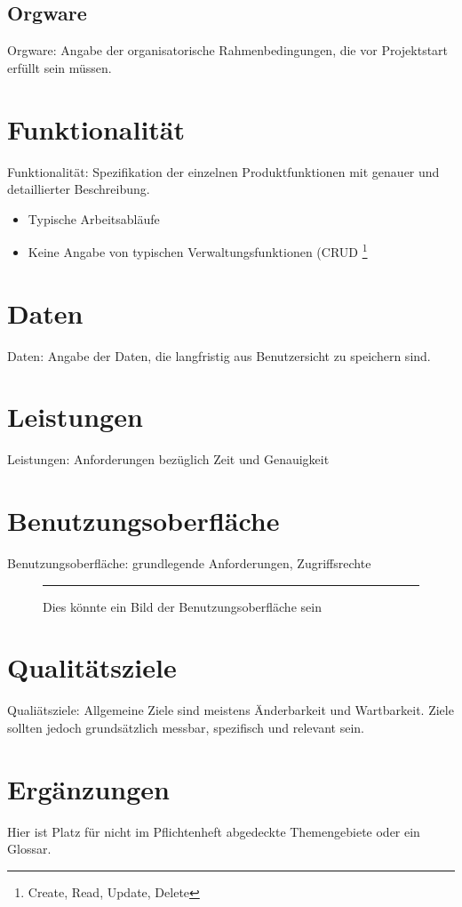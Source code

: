 \documentclass[a4paper]{scrreprt}
\begin{document}
\section{Orgware}
Orgware: Angabe der organisatorische Rahmenbedingungen, die vor Projektstart
erfüllt sein müssen.
 
\chapter{Funktionalität}
Funktionalität: Spezifikation der einzelnen Produktfunktionen mit genauer und
detaillierter Beschreibung.
 
\begin{itemize}
  \item Typische Arbeitsabläufe
  \item Keine Angabe von typischen Verwaltungsfunktionen (CRUD \footnote{Create,
Read, Update, Delete}
\end{itemize}
 
\chapter{Daten}
Daten: Angabe der Daten, die langfristig aus Benutzersicht zu speichern sind.
 
\chapter{Leistungen}
Leistungen: Anforderungen bezüglich Zeit und Genauigkeit
 
\chapter{Benutzungsoberfläche}
Benutzungsoberfläche: grundlegende Anforderungen, Zugriffsrechte
 
\begin{figure}[ht]
  \centering
  \rule{8cm}{6cm}
  \caption{Dies könnte ein Bild der Benutzungsoberfläche sein}
\end{figure}
 
\chapter{Qualitätsziele}
Qualiätsziele: Allgemeine Ziele sind meistens Änderbarkeit und Wartbarkeit.
Ziele sollten jedoch grundsätzlich messbar, spezifisch und relevant sein.
 
\chapter{Ergänzungen}
Hier ist Platz für nicht im Pflichtenheft abgedeckte Themengebiete oder ein
Glossar.
 
\listoffigures
 
\end{document}
